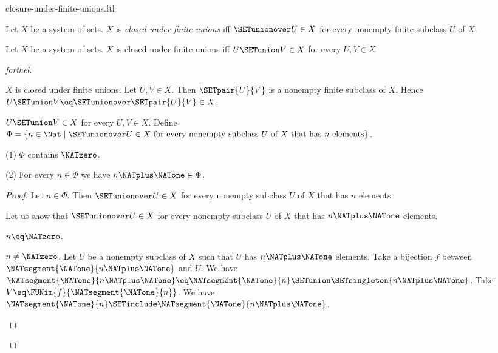 \documentclass{naproche-library}
\begin{document}
\begin{smodule}[title=Closure Under Finite Unions]{closure-under-finite-unions.ftl}

\begin{definition}[forthel,id=FOUNDATIONS_14_7040118193913856]
  Let $X$ be a system of sets.
  $X$ is \emph{closed under finite unions} iff $\SETunionover U \in X$ for every nonempty finite subclass $U$ of $X$.
\end{definition}

\begin{proposition}[forthel,id=FOUNDATIONS_17_4164024962908160]
  Let $X$ be a system of sets.
  $X$ is closed under finite unions iff $U \SETunion V \in X$ for every $U, V \in X$.
\end{proposition}
\begin{proof}[forthel]
  \begin{case}{$X$ is closed under finite unions.}
    Let $U, V \in X$.
    Then $\SETpair{U}{V}$ is a nonempty finite subclass of $X$.
    Hence $U \SETunion V \eq \SETunionover \SETpair{U}{V} \in X$.
  \end{case}

  \begin{case}{$U \SETunion V \in X$ for every $U, V \in X$.}
    Define $\Phi = \{ n \in \Nat \mid \SETunionover U \in X\text{ for every nonempty subclass }U\text{ of }X\text{ that has }n\text{ elements}\}$.

    (1) $\Phi$ contains $\NATzero$.

    (2) For every $n \in \Phi$ we have $n \NATplus \NATone \in \Phi$.
    \begin{proof}
      Let $n \in \Phi$.
      Then $\SETunionover U \in X$ for every nonempty subclass $U$ of $X$ that has $n$ elements.

      Let us show that $\SETunionover U \in X$ for every nonempty subclass $U$ of $X$ that has $n \NATplus \NATone$ elements.

        \begin{case}{$n \eq \NATzero$.} \end{case}

        \begin{case}{$n \neq \NATzero$.}
          Let $U$ be a nonempty subclass of $X$ such that $U$ has $n \NATplus \NATone$ elements.
          Take a bijection $f$ between $\NATsegment{\NATone}{n \NATplus \NATone}$ and $U$.
          We have $\NATsegment{\NATone}{n \NATplus \NATone} \eq \NATsegment{\NATone}{n} \SETunion \SETsingleton{n \NATplus \NATone}$.
          Take $V \eq \FUNim{f}{\NATsegment{\NATone}{n}}$.
          We have $\NATsegment{\NATone}{n} \SETinclude \NATsegment{\NATone}{n \NATplus \NATone}$.


\end{case}
\end{proof}
\end{case}
\end{proof}
\end{smodule}
\end{document}
